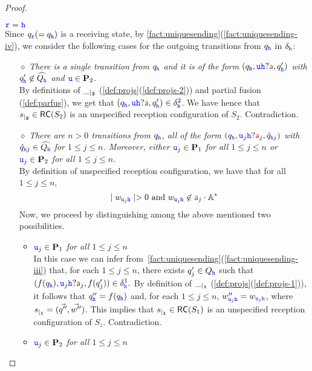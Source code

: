 \begin{proof}
\begin{description}
${\mathtt{\color{blue}{ {r}}}} = {\mathtt{\color{blue}{ {h}}}}$\\
Since ${q}_{\mathtt{\color{blue}{ {r}}}}(= {q}_{\mathtt{\color{blue}{ {h}}}})$ is a receiving state,
by \cref{fact:uniquesending}(\ref{fact:uniquesending-iv}), we consider the following cases
for the outgoing transitions from $q_{\mathtt{\color{blue}{ {h}}}}$ in $\delta_{\mathtt{\color{blue}{ {h}}}}$:
\begin{itemize}
%
\item [\underline{$\diamond$}] 
{\em  There is a single transition from $q_{\mathtt{\color{blue}{ {h}}}}$ and it is of the form
$(q_{\HH},\ttu{\HH}?\msg[a],q'_\hh)$ with $q'_{\mathtt{\color{blue}{ {h}}}}\not\in\widehat{Q_{\mathtt{\color{blue}{ {h}}}}}$ and ${\mathtt{\color{blue}{ {u}}}}\in\mathbf{P}_2$.}\\
By definitions of ${\_}_{\mid_{\mathbf{2}}}$ (\cref{def:projs}(\ref{def:projs-2})) and partial fusion 
(\cref{def:parfus}), we get that $(q_{\HH},\ttu{\HH}?\msg[a],q'_\hh)\in\delta^2_\hh$.
We have hence that ${s}_{\mid_{\mathbf{2}}}\in \mathsf{RC}(S_2)$ is an unspecified reception configuration of $S_2$. Contradiction.
%
\item[\underline{$\diamond$}]
{\em  There are $n>0$ transitions from $q_{\mathtt{\color{blue}{ {h}}}}$, all of the form
$(q_{\HH},\ttu_j\HH?\msg[a]_j,\hat q_{\hh j})$ with $\hat q_{{\mathtt{\color{blue}{ {h}}}} j} \in\widehat{Q_{\mathtt{\color{blue}{ {h}}}}}$
for $1\leq j\leq n$. Moreover, either
${\mathtt{\color{blue}{ {u}}}}_j\in\mathbf{P}_1$ for all $1\leq j\leq n$ or ${\mathtt{\color{blue}{ {u}}}}_j\in\mathbf{P}_2$ for all $1\leq j\leq n$.}\\
By definition of unspecified reception configuration,  we have that for all $1\leq j\leq n$, 
\begin{equation} \label{eq:wur}
\mid w_{\ttu_j\HH}\mid > 0 
\text{ and } w_{\ttu_j\HH}\not\in  \msg[a]_j \cdot \mathbb{A}^*  
\end{equation}
Now, we proceed by distinguishing among the above mentioned two possibilities.
\begin{itemize}
\item
{\it ${\mathtt{\color{blue}{ {u}}}}_j\in\mathbf{P}_1$ for all $1\leq j\leq n$}\\ 
In this case we can infer from~\cref{fact:uniquesending}(\ref{fact:uniquesending-iii}) that, for each $1\leq j\leq n$, there exists $q'_j \in Q_{{\mathtt{\color{blue}{ {h}}}}}$
such that $(f(q_\HH),\ttu_j\HH?\msg[a]_j,f(q'_j))\in\delta^1_\HH.$
 By definition of ${\_}_{\mid_{\mathbf{1}}}$ (\cref{def:projs}(\ref{def:projs-1})), it follows that $q''_{\mathtt{\color{blue}{ {h}}}}=f(q_{\mathtt{\color{blue}{ {h}}}})$ and, for each $1\leq j\leq n$,
$w''_{{\mathtt{\color{blue}{ {u}}}}_j{\mathtt{\color{blue}{ {h}}}}}=w_{{\mathtt{\color{blue}{ {u}}}}_j{\mathtt{\color{blue}{ {h}}}}}$, where 
${s}_{\mid_{\mathbf{1}}}=(\vec{q''},\vec{w''})$. 
 This implies that ${s}_{\mid_{\mathbf{1}}}\in \mathsf{RC}(S_1)$ is an  unspecified reception configuration of $S_z$. Contradiction.\\
%
\item
{\it ${\mathtt{\color{blue}{ {u}}}}_j\in\mathbf{P}_2$ for all $1\leq j\leq n$}\\ 

\end{itemize}
\end{itemize}
\end{description}
\end{proof}
